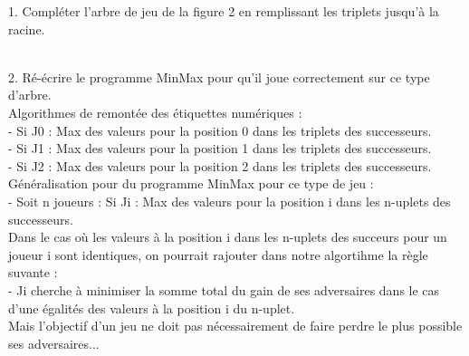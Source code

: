 \documentclass[12pt,a4paper, france]{article}
\newcommand\tab[1][1cm]{\hspace*{#1}}
\begin{document}
1. Compl\'eter l’arbre de jeu de la figure 2 en remplissant les triplets jusqu\textquoteright \`a la racine.\\

 \\ [5mm]

2. R\'e-\'ecrire le programme MinMax pour qu\textquoteright il joue correctement sur ce type d\textquoteright arbre. \\

Algorithmes de remont\'ee des \'etiquettes num\'eriques : \\
\tab \tab - Si J0 : Max des valeurs pour la position 0 dans les triplets des successeurs.\\
\tab \tab - Si J1 : Max des valeurs pour la position 1 dans les triplets des successeurs.\\
\tab \tab - Si J2 : Max des valeurs pour la position 2 dans les triplets des successeurs.\\

G\'en\'eralisation pour du programme MinMax pour ce type de jeu : \\
- Soit n joueurs : Si Ji : Max des valeurs pour la position i dans les n-uplets des successeurs.\\

Dans le cas o\`u les valeurs \`a la position i dans les n-uplets des succeurs pour un joueur i sont identiques, on pourrait rajouter dans notre algortihme la r\`egle suvante : \\
- Ji cherche \`a minimiser la somme total du gain de ses adversaires dans le cas d'une \'egalit\'es des valeurs \`a la position i du n-uplet. \\

Mais l\textquoteright objectif d\textquoteright un jeu ne doit pas n\'ecessairement de faire perdre le plus possible ses adversaires... \\
\end{document}
